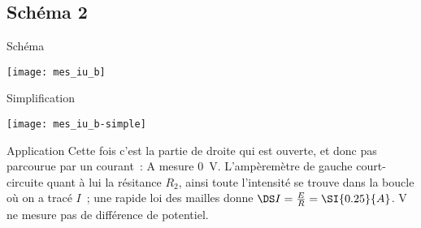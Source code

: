 \documentclass[a4paper, 12pt, final, garamond]{book}
\begin{document}
\subsection{Schéma 2}
\begin{tcbraster}[raster columns=2, raster equal height=rows]
    \begin{NCdefi}{Schéma}
        \begin{center}
            \texttt{[image: mes\_iu\_b]}
        \end{center}
    \end{NCdefi}
    \begin{NCimpl}{Simplification}
        \begin{center}
           \texttt{[image: mes\_iu\_b-simple]}
        \end{center} 
    \end{NCimpl}
\end{tcbraster}
\begin{center}
    \begin{NCexem}[width=.7\linewidth]{Application}
        Cette fois c'est la partie de droite qui est ouverte, et donc pas
        parcourue par un courant~: A mesure \SI{0}{V}. L'ampèremètre de gauche
        court-circuite quant à lui la résitance $R_2$, ainsi toute l'intensité
        se trouve dans la boucle où on a tracé \textcolor{brandeisblue}{$I$}~;
        une rapide loi des mailles donne $\DS I = \frac{E}{R} = \SI{0.25}{A}$. V
        ne mesure pas de différence de potentiel.
    \end{NCexem}
\end{center}
\end{document}
